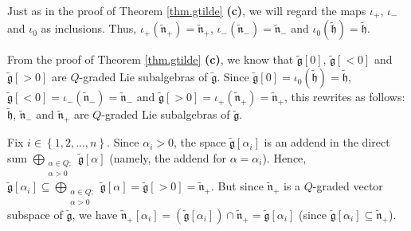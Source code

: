 \documentclass[etingof-lie.tex]{subfiles}
\begin{document}
Just as in the proof of Theorem \ref{thm.gtilde} \textbf{(c)}, we will regard
the maps $\iota_{+}$, $\iota_{-}$ and $\iota_{0}$ as inclusions. Thus,
$\iota_{+}\left(  \widetilde{\mathfrak{n}}_{+}\right)
=\widetilde{\mathfrak{n}}_{+}$, $\iota_{-}\left(  \widetilde{\mathfrak{n}}%
_{-}\right)  =\widetilde{\mathfrak{n}}_{-}$ and $\iota_{0}\left(
\widetilde{\mathfrak{h}}\right)  =\widetilde{\mathfrak{h}}$.

From the proof of Theorem \ref{thm.gtilde} \textbf{(c)}, we know that
$\widetilde{\mathfrak{g}}\left[  0\right]  $, $\widetilde{\mathfrak{g}}\left[
<0\right]  $ and $\widetilde{\mathfrak{g}}\left[  >0\right]  $ are $Q$-graded
Lie subalgebras of $\widetilde{\mathfrak{g}}$. Since $\widetilde{\mathfrak{g}%
}\left[  0\right]  =\iota_{0}\left(  \widetilde{\mathfrak{h}}\right)
=\widetilde{\mathfrak{h}}$, $\widetilde{\mathfrak{g}}\left[  <0\right]
=\iota_{-}\left(  \widetilde{\mathfrak{n}}_{-}\right)
=\widetilde{\mathfrak{n}}_{-}$ and $\widetilde{\mathfrak{g}}\left[  >0\right]
=\iota_{+}\left(  \widetilde{\mathfrak{n}}_{+}\right)
=\widetilde{\mathfrak{n}}_{+}$, this rewrites as follows:
$\widetilde{\mathfrak{h}}$, $\widetilde{\mathfrak{n}}_{-}$ and
$\widetilde{\mathfrak{n}}_{+}$ are $Q$-graded Lie subalgebras of
$\widetilde{\mathfrak{g}}$.

Fix $i\in\left\{  1,2,...,n\right\}  $. Since $\alpha_{i}>0$, the space
$\widetilde{\mathfrak{g}}\left[  \alpha_{i}\right]  $ is an addend in the
direct sum $\bigoplus\limits_{\substack{\alpha\in Q;\\\alpha>0}%
}\widetilde{\mathfrak{g}}\left[  \alpha\right]  $ (namely, the addend for
$\alpha=\alpha_{i}$). Hence, $\widetilde{\mathfrak{g}}\left[  \alpha
_{i}\right]  \subseteq\bigoplus\limits_{\substack{\alpha\in Q;\\\alpha
>0}}\widetilde{\mathfrak{g}}\left[  \alpha\right]  =\widetilde{\mathfrak{g}%
}\left[  >0\right]  =\widetilde{\mathfrak{n}}_{+}$. But since
$\widetilde{\mathfrak{n}}_{+}$ is a $Q$-graded vector subspace of
$\widetilde{\mathfrak{g}}$, we have $\widetilde{\mathfrak{n}}_{+}\left[
\alpha_{i}\right]  =\left(  \widetilde{\mathfrak{g}}\left[  \alpha_{i}\right]
\right)  \cap\widetilde{\mathfrak{n}}_{+}=\widetilde{\mathfrak{g}}\left[
\alpha_{i}\right]  $ (since $\widetilde{\mathfrak{g}}\left[  \alpha
_{i}\right]  \subseteq\widetilde{\mathfrak{n}}_{+}$).
\end{document}
